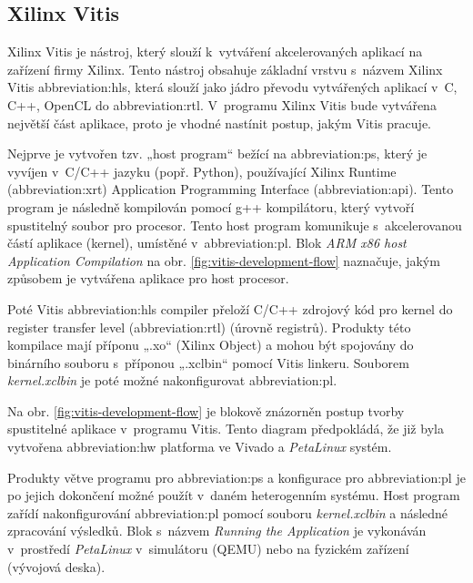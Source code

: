 \documentclass[a4paper, twoside, 11pt]{article}
\begin{document}
		\subsection{Xilinx Vitis}\label{subsec:xilinx-vitis}
		Xilinx Vitis je nástroj, který slouží k~vytváření akcelerovaných aplikací na zařízení firmy Xilinx. Tento nástroj obsahuje základní vrstvu s~názvem Xilinx Vitis \gls{abbreviation:hls}, která slouží jako jádro převodu vytvářených aplikací v~C, C++, OpenCL do \gls{abbreviation:rtl}. V~programu Xilinx Vitis bude vytvářena největší část aplikace, proto je vhodné nastínit postup, jakým Vitis pracuje.
		\par
		Nejprve je vytvořen tzv. „host program“ bežící na \gls{abbreviation:ps}, který je vyvíjen v~C/C++ jazyku (popř. Python), používající Xilinx Runtime (\gls{abbreviation:xrt}) Application Programming Interface (\gls{abbreviation:api}). Tento program je následně kompilován pomocí g++ kompilátoru, který vytvoří spustitelný soubor pro procesor. Tento host program komunikuje s~akcelerovanou částí aplikace (kernel), umístěné v~\gls{abbreviation:pl}. Blok \textit{ARM x86 host Application Compilation} na obr. \ref{fig:vitis-development-flow} naznačuje, jakým způsobem je vytvářena aplikace pro host procesor. \cite{vitis-unified-software-platform-documentation-2022}\par
		Poté Vitis \gls{abbreviation:hls} compiler přeloží C/C++ zdrojový kód pro kernel do register transfer level (\gls{abbreviation:rtl}) (úrovně registrů). Produkty této kompilace mají příponu „.xo“ (Xilinx Object) a mohou být spojovány do binárního souboru s~příponou „.xclbin“ pomocí Vitis linkeru. Souborem \textit{kernel.xclbin} je poté možné nakonfigurovat \gls{abbreviation:pl}. \cite{vitis-unified-software-platform-documentation-2022}\par
		Na obr. \ref{fig:vitis-development-flow} je blokově znázorněn postup tvorby spustitelné aplikace v~programu Vitis. Tento diagram předpokládá, že již byla vytvořena \gls{abbreviation:hw} platforma ve Vivado a \textit{PetaLinux} systém.\par
		Produkty větve programu pro \gls{abbreviation:ps} a konfigurace pro \gls{abbreviation:pl} je po jejich dokončení možné použít v~daném heterogenním systému. Host program zařídí nakonfigurování \gls{abbreviation:pl} pomocí souboru \textit{kernel.xclbin} a následné zpracování výsledků. Blok s~názvem \textit{Running the Application} je vykonáván v~prostředí \textit{PetaLinux} v~simulátoru (QEMU) nebo na fyzickém zařízení (vývojová deska).
\end{document}
